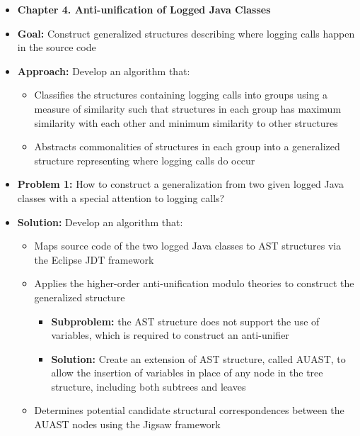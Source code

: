 \documentclass{article}
\newcommand{\bold}{\textbf}
\begin{document}
\begin{itemize} [leftmargin=.1in]
\item \bold{Chapter 4. Anti-unification of Logged Java Classes}
\item \bold{Goal: }Construct generalized structures describing where logging calls happen in the source code

\item \bold{Approach: }Develop an algorithm that:
\begin{itemize} [leftmargin=.1in]
\item Classifies the structures containing logging calls into groups using a measure of similarity such that structures in each group has maximum similarity with each other and minimum similarity to other structures
\item Abstracts commonalities of structures in each group into a generalized structure representing where logging calls do occur
\end{itemize}

\item \bold{Problem 1: }How to construct a generalization from two given logged Java classes with a special attention to logging calls?
\item \bold{Solution: }Develop an algorithm that:
\begin{itemize} [leftmargin=.1in]
\item Maps source code of the two logged Java classes to AST structures via the Eclipse JDT framework
\item Applies the higher-order anti-unification modulo theories to construct the generalized structure
\begin{itemize}
\item \bold{Subproblem: }the AST structure does not support the use of variables, which is required to construct an anti-unifier
\item \bold{Solution: }Create an extension of AST structure, called AUAST, to allow the insertion of variables in place of any node in the tree structure, including both subtrees and leaves
\end{itemize}
\item Determines potential candidate structural correspondences between the AUAST nodes using the Jigsaw framework


\end{itemize}
\end{itemize}
\end{document}
